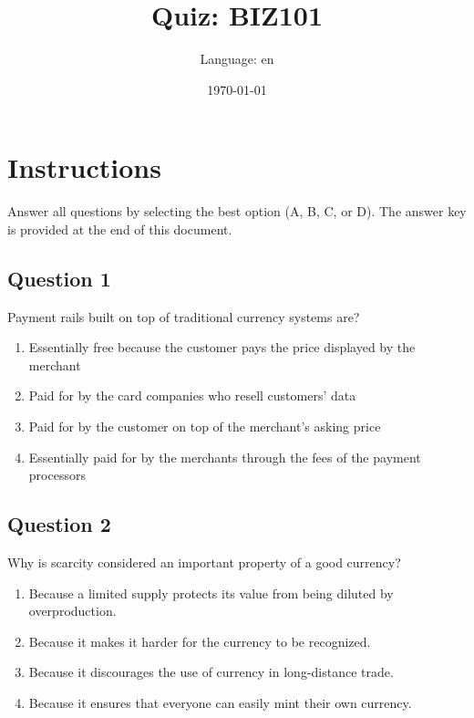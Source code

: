 \documentclass[12pt,a4paper]{article}
\title{Quiz: BIZ101}
\author{Language: en}
\date{\today}
\begin{document}
\maketitle
\thispagestyle{fancy}

\section*{Instructions}
Answer all questions by selecting the best option (A, B, C, or D). The answer key is provided at the end of this document.

\bigskip


\subsection*{Question 1}
Payment rails built on top of traditional currency systems are?

\begin{enumerate}[label=\Alph*., leftmargin=*]
\item Essentially free because the customer pays the price displayed by the merchant
\item Paid for by the card companies who resell customers' data
\item Paid for by the customer on top of the merchant's asking price
\item Essentially paid for by the merchants through the fees of the payment processors
\end{enumerate}

\bigskip


\subsection*{Question 2}
Why is scarcity considered an important property of a good currency?

\begin{enumerate}[label=\Alph*., leftmargin=*]
\item Because a limited supply protects its value from being diluted by overproduction.
\item Because it makes it harder for the currency to be recognized.
\item Because it discourages the use of currency in long-distance trade.
\item Because it ensures that everyone can easily mint their own currency.
\end{enumerate}

\bigskip
\end{document}
